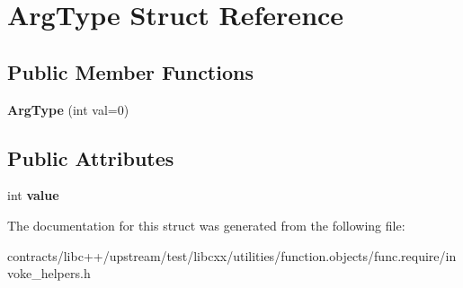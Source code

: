 \hypertarget{struct_arg_type}{}\section{Arg\+Type Struct Reference}
\label{struct_arg_type}
\subsection*{Public Member Functions}
\begin{DoxyCompactItemize}
\item 
\mbox{\label{struct_arg_type_aa68a6f342783110c6759a7ff170f0df2}} 
{\bfseries Arg\+Type} (int val=0)
\end{DoxyCompactItemize}
\subsection*{Public Attributes}
\begin{DoxyCompactItemize}
\item 
\mbox{\label{struct_arg_type_ab1178d39ea83142785387f67af355f70}} 
int {\bfseries value}
\end{DoxyCompactItemize}


The documentation for this struct was generated from the following file\+:\begin{DoxyCompactItemize}
\item 
contracts/libc++/upstream/test/libcxx/utilities/function.\+objects/func.\+require/invoke\+\_\+helpers.\+h\end{DoxyCompactItemize}
